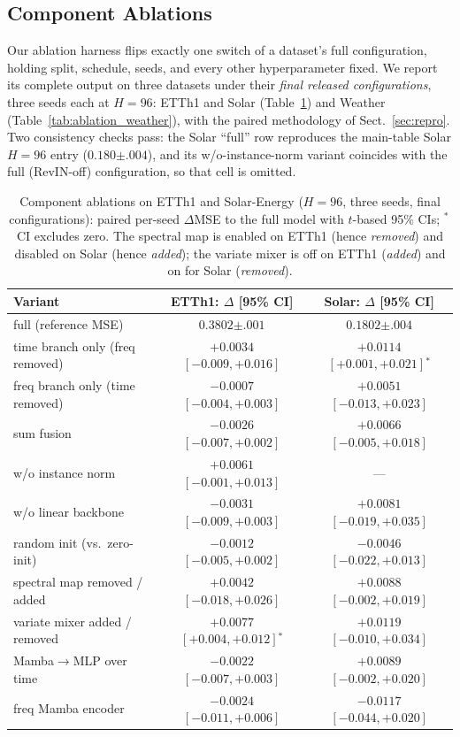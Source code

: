\documentclass[runningheads]{llncs}
\begin{document}
\subsection{Component Ablations}
\label{sec:ablation}

Our ablation harness flips exactly one switch of a dataset's full
configuration, holding split, schedule, seeds, and every other
hyperparameter fixed. We report its complete output on three datasets under
their \emph{final released configurations}, three seeds each at $H{=}96$:
ETTh1 and Solar (Table~\ref{tab:ablation}) and Weather
(Table~\ref{tab:ablation_weather}), with the paired methodology of
Sect.~\ref{sec:repro}. Two consistency checks pass: the Solar ``full'' row
reproduces the main-table Solar $H{=}96$ entry
($0.180{\scriptstyle\pm.004}$), and its w/o-instance-norm variant coincides
with the full (RevIN-off) configuration, so that cell is omitted.

\begin{table}[tb]
\centering
\caption{Component ablations on ETTh1 and Solar-Energy ($H{=}96$, three
seeds, final configurations): paired per-seed $\Delta$MSE to the full
model with $t$-based 95\% CIs; $^{*}$\,CI excludes zero. The spectral map
is enabled on ETTh1 (hence \emph{removed}) and disabled on Solar (hence
\emph{added}); the variate mixer is off on ETTh1 (\emph{added}) and on
for Solar (\emph{removed}).}
\label{tab:ablation}
\scriptsize
\setlength{\tabcolsep}{3pt}
\begin{tabular}{@{}lcc@{}}
\toprule
Variant & ETTh1: $\Delta$ [95\% CI] & Solar: $\Delta$ [95\% CI] \\
\midrule
full (reference MSE) & $0.3802{\scriptstyle\pm.001}$ & $0.1802{\scriptstyle\pm.004}$ \\
\;\;time branch only (freq removed) & $+0.0034$ $[-0.009,+0.016]$ & $+0.0114$ $[+0.001,+0.021]$$^{*}$ \\
\;\;freq branch only (time removed) & $-0.0007$ $[-0.004,+0.003]$ & $+0.0051$ $[-0.013,+0.023]$ \\
\;\;sum fusion & $-0.0026$ $[-0.007,+0.002]$ & $+0.0066$ $[-0.005,+0.018]$ \\
\;\;w/o instance norm & $+0.0061$ $[-0.001,+0.013]$ & --- \\
\;\;w/o linear backbone & $-0.0031$ $[-0.009,+0.003]$ & $+0.0081$ $[-0.019,+0.035]$ \\
\;\;random init (vs.\ zero-init) & $-0.0012$ $[-0.005,+0.002]$ & $-0.0046$ $[-0.022,+0.013]$ \\
\;\;spectral map removed / added & $+0.0042$ $[-0.018,+0.026]$ & $+0.0088$ $[-0.002,+0.019]$ \\
\;\;variate mixer added / removed & $+0.0077$ $[+0.004,+0.012]$$^{*}$ & $+0.0119$ $[-0.010,+0.034]$ \\
\;\;Mamba$\rightarrow$MLP over time & $-0.0022$ $[-0.007,+0.003]$ & $+0.0089$ $[-0.002,+0.020]$ \\
\;\;freq Mamba encoder & $-0.0024$ $[-0.011,+0.006]$ & $-0.0117$ $[-0.044,+0.020]$ \\
\bottomrule
\end{tabular}
\end{table}
\end{document}
